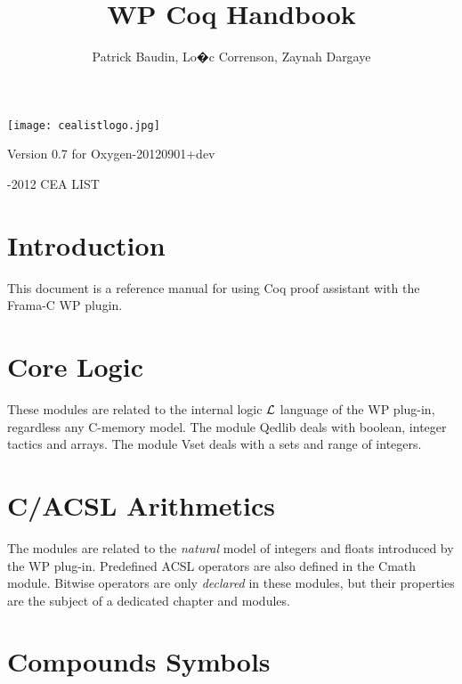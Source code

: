 \documentclass[web]{frama-c-book}
\begin{document}
\begin{titlepage}
\texttt{[image: cealistlogo.jpg]}
\hfill~
\vfill
\title{WP Coq Handbook}%
{Version 0.7 for Oxygen-20120901+dev}
\author{Patrick Baudin, Lo�c Correnson, Zaynah Dargaye}
\begin{center}
  \fcaffiliationen
\end{center}
\vfill
\begin{flushleft}
  -2012 CEA LIST
\end{flushleft}
\end{titlepage}

\cleardoublepage
\markright{}
\tableofcontents

\chapter*{Introduction}

This document is a reference manual for using \textsf{Coq} proof assistant
with the \textsf{Frama-C} \textsf{WP} plugin.

\chapter{Core Logic}

These modules are related to the internal logic $\cal L$ language of
the \textsf{WP} plug-in, regardless any \textsf{C}-memory model. The
module \textsf{Qedlib} deals with boolean, integer tactics and arrays.
The module \textsf{Vset} deals with a sets and range of integers.




\chapter{C/ACSL Arithmetics}

The modules are related to the \textit{natural} model of integers and
floats introduced by the \textsf{WP} plug-in. Predefined \textsf{ACSL}
operators are also defined in the \textsf{Cmath} module. Bitwise
operators are only \textit{declared} in these modules, but their
properties are the subject of a dedicated chapter and modules.





\chapter{Compounds Symbols}
\end{document}
